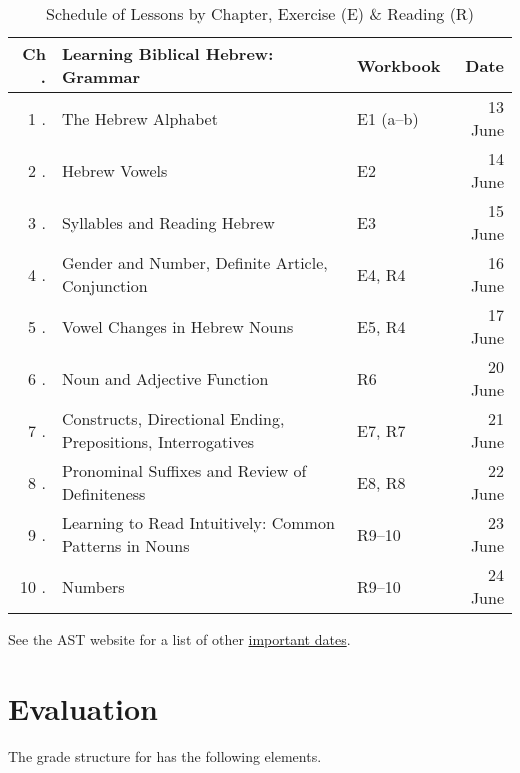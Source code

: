 \documentclass[titlepage]{article}
\begin{document}
\begin{table}[htbp]%
  \centering%
  \begin{tabular}{@{}r<{.}@{ }llr}
    \toprule
    \bfseries Ch & \textbf{Learning Biblical Hebrew: Grammar} & \textbf{Workbook} & \textbf{Date} \\
    \midrule
    1  & The Hebrew Alphabet                                          & E1 (a–b) & 13 June \\
    2  & Hebrew Vowels                                                & E2       & 14 June \\
    3  & Syllables and Reading Hebrew                                 & E3       & 15 June \\
    4  & Gender and Number, Definite Article, Conjunction             & E4, R4   & 16 June \\
    5  & Vowel Changes in Hebrew Nouns                                & E5, R4   & 17 June \\
    6  & Noun and Adjective Function                                  & R6       & 20 June \\
    7  & Constructs, Directional Ending, Prepositions, Interrogatives & E7, R7   & 21 June \\
    8  & Pronominal Suffixes and Review of Definiteness               & E8, R8   & 22 June \\
    9  & Learning to Read Intuitively: Common Patterns in Nouns       & R9–10    & 23 June \\
    10 & Numbers                                                      & R9–10    & 24 June \\
    \bottomrule
  \end{tabular}
  \caption{Schedule of Lessons by Chapter, Exercise (E) \& Reading (R)}
  \label{schedule}
\end{table}

See the AST website for a list of other \href{http://www.astheology.ns.ca/students/academic-dates.html}{important dates}.

\section{Evaluation}
\label{evaluation}

The grade structure for \ccode has the following elements.
\end{document}
